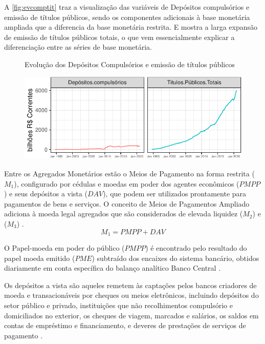 \documentclass[12pt,12pt,openright,oneside,a4paper,chapter=TITLE,section=TITLE,subsection=TITLE,subsubsection=TITLE,english,french,spanish,portugues,sumario=tradicional]{abntex2}
\begin{document}
A \autoref{fig:evcomptit} traz a visualização das variáveis de Depósitos compulsórios e emissão de títulos públicos, sendo os componentes adicionais à base monetária ampliada que a diferencia da base monetária restrita. E mostra a larga expansão de emissão de títulos públicos totais, o que vem essencialmente explicar a diferenciação entre as séries de base monetária.

\begin{figure}
 {Evolução dos Depósitos Compulsórios e emissão de títulos públicos}

\begin{center}\includegraphics{12-exportedfigures/base components-1} \end{center}
\label{fig:evcomptit}
\end{figure}

Entre os Agregados Monetários estão o Meios de Pagamento na forma restrita (\(M_1\)), configurado por cédulas e moedas em poder dos agentes econômicos (\(PMPP\)) e seus depósitos a vista (\(DAV\)), que podem ser utilizados prontamente para pagamentos de bens e serviços. O conceito de Meios de Pagamentos Ampliado adiciona à moeda legal agregados que são considerados de elevada liquidez (\(M_2\)) e (\(M_3\)) \cite{bcb:2019} \cite{sgs:mpa}.
\[
M_1 = PMPP + DAV
\]

O Papel-moeda em poder do público (\(PMPP\)) é encontrado pelo resultado do papel moeda emitido (\(PME\)) subtraído dos encaixes do sistema bancário, obtidos diariamente em conta específica do balanço analítico Banco Central \cite{sgs:m1}.

Os depósitos a vista são aqueles remetem às captações pelos bancos criadores de moeda e transacionáveis por cheques ou meios eletrônicos, incluindo depósitos do setor público e privado, instituições que não recolhimentos compulsório e domiciliados no exterior, os cheques de viagem, marcados e salários, os saldos em contas de empréstimo e financiamento, e deveres de prestações de serviços de pagamento \cite{sgs:m1}.
\end{document}
